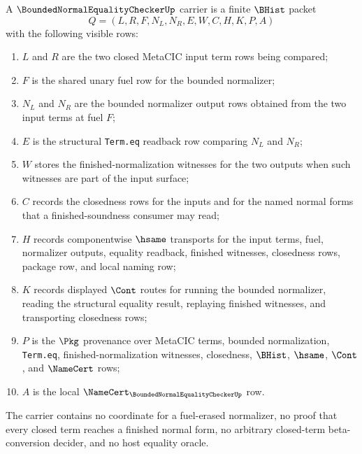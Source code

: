 \begin{definition}
\label{def:bounded-normal-equality-checker-carrier}
A $\BoundedNormalEqualityCheckerUp$ carrier is a finite $\BHist$ packet
$$
Q=(L,R,F,N_L,N_R,E,W,C,H,K,P,A)
$$
with the following visible rows:
\begin{enumerate}
\item $L$ and $R$ are the two closed MetaCIC input term rows being compared;
\item $F$ is the shared unary fuel row for the bounded normalizer;
\item $N_L$ and $N_R$ are the bounded normalizer output rows obtained from
the two input terms at fuel $F$;
\item $E$ is the structural \texttt{Term.eq} readback row comparing $N_L$ and
$N_R$;
\item $W$ stores the finished-normalization witnesses for the two outputs
when such witnesses are part of the input surface;
\item $C$ records the closedness rows for the inputs and for the named normal
forms that a finished-soundness consumer may read;
\item $H$ records componentwise $\hsame$ transports for the input terms,
fuel, normalizer outputs, equality readback, finished witnesses, closedness
rows, package row, and local naming row;
\item $K$ records displayed $\Cont$ routes for running the bounded normalizer,
reading the structural equality result, replaying finished witnesses, and
transporting closedness rows;
\item $P$ is the $\Pkg$ provenance over MetaCIC terms, bounded normalization,
\texttt{Term.eq}, finished-normalization witnesses, closedness, $\BHist$,
$\hsame$, $\Cont$, and $\NameCert$ rows;
\item $A$ is the local $\NameCert_{\BoundedNormalEqualityCheckerUp}$ row.
\end{enumerate}
The carrier contains no coordinate for a fuel-erased normalizer, no proof that
every closed term reaches a finished normal form, no arbitrary closed-term
beta-conversion decider, and no host equality oracle.
\end{definition}

